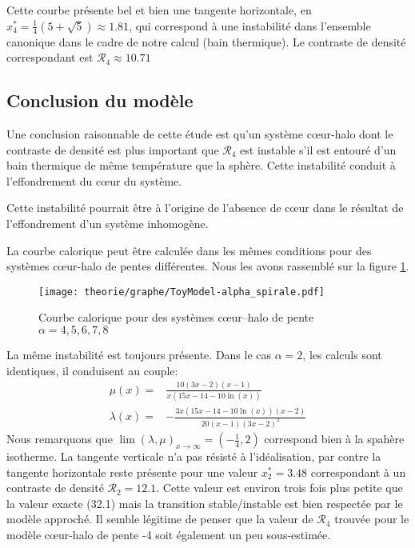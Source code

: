 	Cette courbe présente bel et bien une tangente horizontale, en $x^*_4= \frac{1}{4} \left(5+\sqrt{5}\right) \approx 1.81$, qui correspond à une
	instabilité dans l'ensemble canonique dans le cadre de notre calcul (bain thermique). Le contraste de densité correspondant est
	$\mathcal{R}_4\approx 10.71$

\subsection{Conclusion du modèle}

	Une conclusion raisonnable de cette étude est qu'un système cœur-halo dont le contraste de densité est plus important que $\mathcal{R}_4$ est
	instable s'il est entouré d'un bain thermique de même température que la sphère. Cette instabilité conduit à l'effondrement du cœur du
	système.

	Cette instabilité pourrait être à l'origine de l'absence de cœur dans le résultat de l'effondrement d'un système inhomogène.

	La courbe calorique peut être calculée dans les mêmes conditions pour des systèmes cœur-halo de pentes différentes. Nous les avons rassemblé
	sur la figure \ref{ToyModel::AllAlpha}.
	\begin{figure}
			\centering \texttt{[image: theorie/graphe/ToyModel-alpha\_spirale.pdf]}
			\caption{Courbe calorique pour des systèmes cœur--halo de pente $\alpha=4, 5, 6, 7, 8$\label{ToyModel::AllAlpha}}
	\end{figure}
	La même instabilité est toujours présente. Dans le cas $\alpha=2$, les calculs sont identiques, il conduisent au couple:
	\begin{eqnarray}
		\mu(x) =& \frac{10 (3x-2) (x-1)}{x(15x-14-10\ln(x))} \\
		\lambda(x) =& -\frac{3x(15x-14-10\ln(x))(x-2)}{20(x-1)(3x-2)^2}
	\end{eqnarray}
	Nous remarquons que $\lim(\lambda,\mu)_{x\to\infty}=(-\frac{1}{4},2)$ correspond bien à la spahère isotherme. La tangente verticale n'a pas
	résisté à l'idéalisation, par contre la tangente horizontale reste présente pour une valeur $x^*_2=3.48$ correspondant à un contraste de
	densité $\mathcal{R}_2= 12.1$. Cette valeur est environ trois fois plus petite que la valeur exacte (32.1) mais la transition stable/instable
	est bien respectée par le modèle approché. Il semble légitime de penser que la valeur de $\mathcal{R}_4$ trouvée pour le modèle cœur-halo de
	pente -4 soit également un peu sous-estimée.
